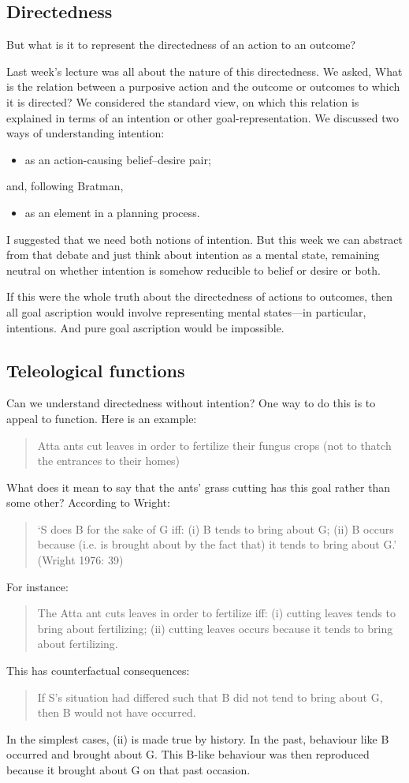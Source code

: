 \documentclass[12pt,\papersize]{extarticle}
\begin{document}
\subsection{Directedness}
But what is it to represent the directedness of an action to an outcome?

Last week's lecture was all about the nature of this directedness. 
We asked, What is the relation between a purposive action and the outcome or outcomes to which it is directed?
We considered the standard view, on which this relation is explained in terms of an intention or other goal-representation.
We discussed two ways of understanding intention:
\begin{itemize}
\item as an action-causing belief--desire pair;
\end{itemize}
and, following Bratman,
\begin{itemize}
\item as an element in a planning process.
\end{itemize}
I suggested that we need both notions of intention.
But this week we can abstract from that debate and just think about intention as a mental state, remaining neutral on whether intention is somehow reducible to belief or desire or both.

If this were the whole truth about the directedness of actions to outcomes, then all goal ascription would involve representing mental states---in particular, intentions.
And pure goal ascription would be impossible.

\subsection{Teleological functions}
Can we understand directedness without intention?
One way to do this is to appeal to function.
Here is an example:
%
\begin{quote}
Atta ants cut leaves in order to fertilize their fungus crops (not to thatch the entrances to their homes) \citep{Schultz:1999ps}
\end{quote}
%
What does it mean to say that the ants’ grass cutting has this goal rather than some other? According to Wright:
\begin{quote}
`S does B for the sake of G iff: (i) B tends to bring about G; (ii) B occurs because (i.e. is brought about by the fact that) it tends to bring about G.' (Wright 1976: 39)
\end{quote}
%
For instance:
%
\begin{quote}
The Atta ant cuts leaves in order to fertilize iff: (i) cutting leaves tends to bring about fertilizing; (ii) cutting leaves occurs because it tends to bring about fertilizing.
\end{quote}
%
This has counterfactual consequences:
\begin{quote}
If S’s situation had differed such that B did not tend to bring about G, then B would not have occurred.
\end{quote}
%
In the simplest cases, (ii) is made true by history. In the past, behaviour like B occurred and brought about G. This B-like behaviour was then reproduced because it brought about G on that past occasion.
\end{document}
